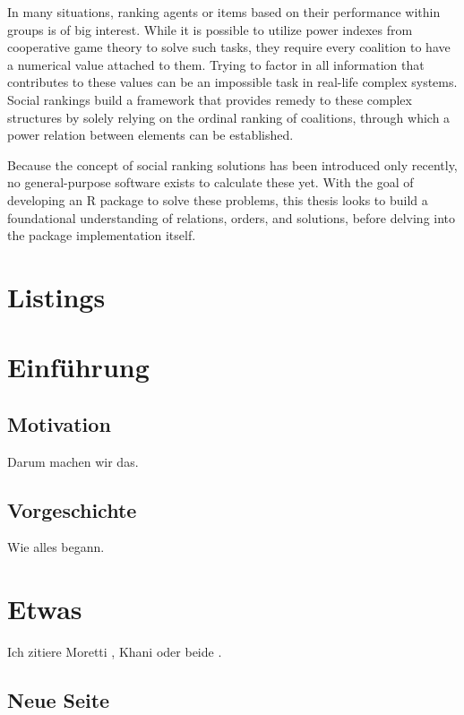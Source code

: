 \documentclass[
  12pt,
  a4paper,
  oneside]{book}
\makeatletter
\newcommand\listoflistings{%
  \chapter*{Listings}\@starttoc{lsts}}
\makeatother
\begin{document}
In many situations, ranking agents or items based on their performance
within groups is of big interest. While it is possible to utilize power
indexes from cooperative game theory to solve such tasks, they require
every coalition to have a numerical value attached to them. Trying to
factor in all information that contributes to these values can be an
impossible task in real-life complex systems. Social rankings build a
framework that provides remedy to these complex structures by solely
relying on the ordinal ranking of coalitions, through which a power
relation between elements can be established.

Because the concept of social ranking solutions has been introduced only
recently, no general-purpose software exists to calculate these yet.
With the goal of developing an R package to solve these problems, this
thesis looks to build a foundational understanding of relations, orders,
and solutions, before delving into the package implementation itself.

\tableofcontents
\listoffigures
\listoftables
\listoflistings

\mainmatter

\hypertarget{einfuxfchrung}{%
\chapter{Einführung}\label{einfuxfchrung}}

\hypertarget{motivation}{%
\section{Motivation}\label{motivation}}

Darum machen wir das.

\hypertarget{vorgeschichte}{%
\section{Vorgeschichte}\label{vorgeschichte}}

Wie alles begann.

\hypertarget{etwas}{%
\chapter{Etwas}\label{etwas}}

Ich zitiere Moretti \citep{2017Moretti}, Khani \citep{2019Khani} oder
beide \citep{2017Moretti, 2019Khani}.

\newpage

\hypertarget{neue-seite}{%
\section{Neue Seite}\label{neue-seite}}
\end{document}
